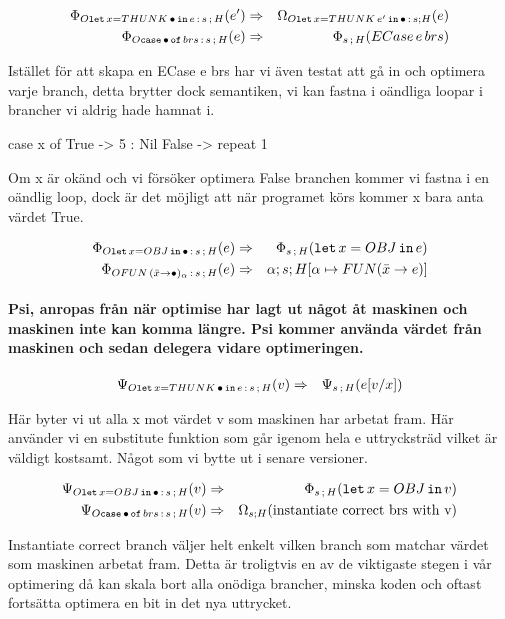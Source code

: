 \documentclass[../Optimise]{subfiles}
\begin{document}
\begin{align*}
\Phi_{O\mathtt{let\,}x=THUNK\,\bullet\,\mathtt{in}\,e\,:\,s\,;\,H}(e') & \Rightarrow & \Omega_{O\mathtt{let\,}x=THUNK\,e'\,\mathtt{in}\,\bullet\,:\,s;H}(e)\\
\Phi_{O\mathtt{case}\,\bullet\,\mathtt{of}\,brs\,:\,s\,;\,H}(e) & \Rightarrow & \Phi_{s\,;\,H}(ECase\, e\, brs)\end{align*}


Istället för att skapa en ECase e brs har vi även testat att gå in
och optimera varje branch, detta brytter dock semantiken, vi kan fastna
i oändliga loopar i brancher vi aldrig hade hamnat i. 

\begin{codeEx}
case x of
    True  -> 5 : Nil
    False -> repeat 1
\end{codeEx}
Om x är okänd och vi försöker optimera False branchen kommer vi fastna
i en oändlig loop, dock är det möjligt att när programet körs kommer
x bara anta värdet True. 

\begin{align*}
\Phi_{O\mathtt{let\,}x=OBJ\,\mathtt{in}\,\bullet\,:\,s\,;\,H}(e) & \Rightarrow & \Phi_{s\,;\,H}(\mathtt{let}\,x=OBJ\,\mathtt{in}\,e)\\
\Phi_{OFUN\,(\bar{x}\to\bullet)_{\alpha}\,:\,s\,;\,H}(e) & \Rightarrow & \alpha;s;H[\alpha\mapsto FUN(\bar{x}\to e)]\end{align*}



\paragraph{Psi, anropas från när optimise har lagt ut något åt maskinen och
maskinen inte kan komma längre. Psi kommer använda värdet från maskinen
och sedan delegera vidare optimeringen.}

\begin{align*}
\Psi_{O\mathtt{let\,}x=THUNK\,\bullet\,\mathtt{in}\,e\,:\,s\,;\,H}(v) & \Rightarrow & \Psi_{s\,;\,H}(e[v/x])\end{align*}


Här byter vi ut alla x mot värdet v som maskinen har arbetat fram.
Här använder vi en substitute funktion som går igenom hela e uttrycksträd
vilket är väldigt kostsamt. Något som vi bytte ut i senare versioner.

\begin{align*}
\Psi_{O\mathtt{let\,}x=OBJ\,\mathtt{in}\,\bullet\,:\,s\,;\,H}(v) & \Rightarrow & \Phi_{s\,;\,H}(\mathtt{let}\,x=OBJ\,\mathtt{in}\,v)\\
\Psi_{O\mathtt{case}\,\bullet\,\mathtt{of}\,brs\,:\,s\,;\,H}(v) & \Rightarrow & \Omega_{s;H}(\text{instantiate correct brs with v})\end{align*}


Instantiate correct branch väljer helt enkelt vilken branch som matchar
värdet som maskinen arbetat fram. Detta är troligtvis en av de viktigaste
stegen i vår optimering då kan skala bort alla onödiga brancher, minska
koden och oftast fortsätta optimera en bit in det nya uttrycket.
\end{document}
